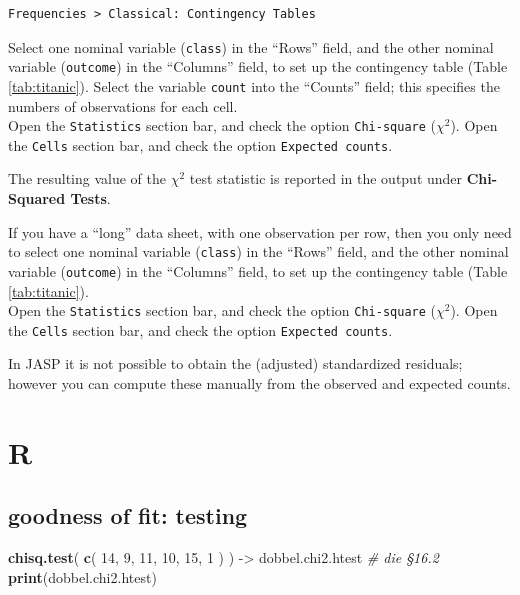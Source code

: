 \documentclass[
]{book}
\newenvironment{Shaded}{\begin{snugshade}}{\end{snugshade}}
\newcommand{\CommentTok}[1]{\textcolor[rgb]{0.56,0.35,0.01}{\textit{#1}}}
\newcommand{\DecValTok}[1]{\textcolor[rgb]{0.00,0.00,0.81}{#1}}
\newcommand{\FunctionTok}[1]{\textcolor[rgb]{0.13,0.29,0.53}{\textbf{#1}}}
\newcommand{\NormalTok}[1]{#1}
\newcommand{\OtherTok}[1]{\textcolor[rgb]{0.56,0.35,0.01}{#1}}
\begin{document}
\begin{verbatim}
Frequencies > Classical: Contingency Tables
\end{verbatim}

Select one nominal variable (\texttt{class}) in the ``Rows'' field, and the other nominal variable (\texttt{outcome}) in the ``Columns'' field, to set up the contingency table (Table \ref{tab:titanic}).
Select the variable \texttt{count} into the ``Counts'' field; this specifies the numbers of observations for each cell.\\
Open the \texttt{Statistics} section bar, and check the option \texttt{Chi-square} (\(\chi^2\)).
Open the \texttt{Cells} section bar, and check the option \texttt{Expected\ counts}.

The resulting value of the \(\chi^2\) test statistic is reported in the output under \textbf{Chi-Squared Tests}.

If you have a ``long'' data sheet, with one observation per row, then you only need to select one nominal variable (\texttt{class}) in the ``Rows'' field, and the other nominal variable (\texttt{outcome}) in the ``Columns'' field, to set up the contingency table (Table \ref{tab:titanic}).\\
Open the \texttt{Statistics} section bar, and check the option \texttt{Chi-square} (\(\chi^2\)).
Open the \texttt{Cells} section bar, and check the option \texttt{Expected\ counts}.

In JASP it is not possible to obtain the (adjusted) standardized residuals; however you can compute these manually from the observed and expected counts.

\hypertarget{r-17}{%
\section{R}\label{r-17}}

\hypertarget{goodness-of-fit-testing-2}{%
\subsection{goodness of fit: testing}\label{goodness-of-fit-testing-2}}

\begin{Shaded}
\begin{Highlighting}[]
\FunctionTok{chisq.test}\NormalTok{( }\FunctionTok{c}\NormalTok{( }\DecValTok{14}\NormalTok{, }\DecValTok{9}\NormalTok{, }\DecValTok{11}\NormalTok{, }\DecValTok{10}\NormalTok{, }\DecValTok{15}\NormalTok{, }\DecValTok{1}\NormalTok{ ) ) }\OtherTok{{-}\textgreater{}}\NormalTok{ dobbel.chi2.htest }\CommentTok{\# die §16.2}
\FunctionTok{print}\NormalTok{(dobbel.chi2.htest)}
\end{Highlighting}
\end{Shaded}
\end{document}
